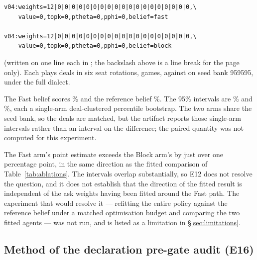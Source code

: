 \begin{verbatim}
v04:weights=12|0|0|0|0|0|0|0|0|0|0|0|0|0|0|0|0|0|0|0,\
    value=0,topk=0,ptheta=0,pphi=0,belief=fast

v04:weights=12|0|0|0|0|0|0|0|0|0|0|0|0|0|0|0|0|0|0|0,\
    value=0,topk=0,ptheta=0,pphi=0,belief=block
\end{verbatim}

(written on one line each in ; the backslash above
is a line break for the page only). Each plays \numETwelveDeals{} deals in six
seat rotations, \numETwelveGames{} games, against \vthree{} on seed bank 959595,
under the full dialect.

The Fast belief scores \numETwelveFast\% and the reference belief
\numETwelveBlock\%. The 95\% intervals are \numETwelveFastCI\% and
\numETwelveBlockCI\%, each a single-arm deal-clustered percentile bootstrap. The
two arms share the seed bank, so the deals are matched, but the artifact reports
those single-arm intervals rather than an interval on the difference; the paired
quantity was not computed for this experiment.

The Fast arm's point estimate exceeds the Block arm's by just over one
percentage point, in the same direction as
the fitted comparison of Table~\ref{tab:ablations}. The intervals overlap
substantially, so E12 does not resolve the question, and it does not establish
that the direction of the fitted result is independent of the ask weights having
been fitted around the Fast path. The experiment that would resolve it ---
refitting the entire policy against the reference belief under a matched
optimisation budget and comparing the two fitted agents --- was not run, and is
listed as a limitation in \S\ref{sec:limitations}.

\subsection{Method of the declaration pre-gate audit (E16)}
\label{app:abl-gateaudit}

\begin{table}[!htbp]
\centering
\caption{Declaration pre-gate false-negative audit (E16). Population: the primary
bank of \numHtHDeals{} held-out deals in six seat rotations, seed $90210$, all
eight panel opponents, \vfast{} with policy weights frozen; the unit is one
declaration opportunity, or for the first three rows one (opportunity, live
half-suit) pair. Shares are exact fractions of the stated denominator; no
intervals are constructed.}
\label{tab:gateaudit}
\small

\end{table}


